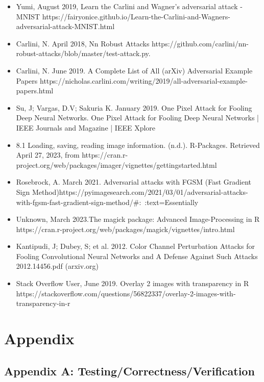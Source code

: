 \documentclass{article}
\begin{document}
\newpage
 \begin{thebibliography}{99}
 \begin{itemize}
    \item  Yumi, August 2019, Learn the Carlini and Wagner's adversarial attack - MNIST https://fairyonice.github.io/Learn-the-Carlini-and-Wagners-adversarial-attack-MNIST.html
    \item Carlini, N. April 2018, Nn Robust Attacks https://github.com/carlini/nn-robust-attacks/blob/master/test-attack.py.
    \item Carlini, N. June 2019. A Complete List of All (arXiv) Adversarial Example Papers https://nicholas.carlini.com/writing/2019/all-adversarial-example-papers.html
    \item  Su, J; Vargas, D.V; Sakuria K. January 2019. One Pixel Attack for Fooling Deep Neural Networks. One Pixel Attack for Fooling Deep Neural Networks | IEEE Journals and Magazine | IEEE Xplore
    \item  8.1 Loading, saving, reading image information. (n.d.). R-Packages. Retrieved April 27, 2023, from https://cran.r-project.org/web/packages/imager/vignettes/gettingstarted.html
    \item Rosebrock, A. March 2021. Adversarial attacks with FGSM (Fast Gradient Sign Method)https://pyimagesearch.com/2021/03/01/adversarial-attacks-with-fgsm-fast-gradient-sign-method/#:~:text=Essentially%
    \item Unknown, March 2023.The magick package: Advanced Image-Processing in R https://cran.r-project.org/web/packages/magick/vignettes/intro.html
    \item Kantipudi, J; Dubey, S; et al. 2012. Color Channel Perturbation Attacks for Fooling Convolutional Neural Networks and A Defense Against Such Attacks 2012.14456.pdf (arxiv.org)
    \item Stack Overflow User, June 2019. Overlay 2 images with transparency in R
    https://stackoverflow.com/questions/56822337/overlay-2-images-with-transparency-in-r

\end{itemize}



\end{thebibliography}
\newpage
\section{Appendix}
\subsection{Appendix A: Testing/Correctness/Verification}
\end{document}
